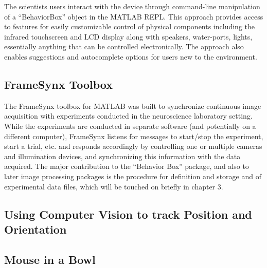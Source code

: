 \documentclass[../main.tex]{subfiles}
\begin{document}
The scientists users interact with the device through command-line manipulation of a ``BehaviorBox'' object in the MATLAB REPL.
This approach provides access to features for easily customizable control of physical components including the infrared touchscreen and LCD display along with speakers, water-ports, lights, essentially anything that can be controlled electronically.
The approach also enables suggestions and autocomplete options for users new to the environment.

\subsection{FrameSynx Toolbox}\label{sec:framesynx-toolbox}

The FrameSynx toolbox for MATLAB was built to synchronize continuous image acquisition with experiments conducted in the neuroscience laboratory setting.
While the experiments are conducted in separate software (and potentially on a different computer), FrameSynx listens for messages to start/stop the experiment, start a trial, etc. and responds accordingly by controlling one or multiple cameras and illumination devices, and synchronizing this information with the data acquired.
The major contribution to the ``Behavior Box'' package, and also to later image processing packages is the procedure for definition and storage and of experimental data files, which will be touched on briefly in chapter 3.

\subsection{Using Computer Vision to track Position and Orientation}\label{sec:using-computer-vision-to-track-position-and-orientation}

\subsection{Mouse in a Bowl}\label{sec:mouse-in-a-bowl}
\end{document}

